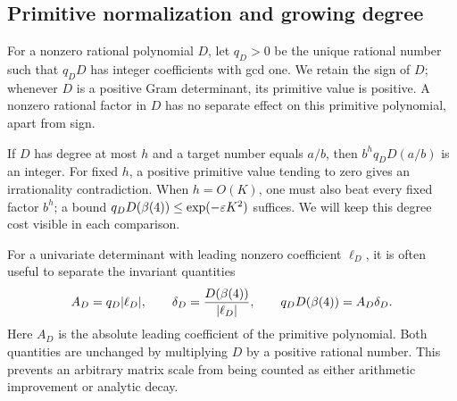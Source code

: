 \subsection{Primitive normalization and growing degree}
For a nonzero rational polynomial $D$, let $q_D>0$ be the unique rational
number such that $q_DD$ has integer coefficients with gcd one. We retain
the sign of $D$; whenever $D$ is a positive Gram determinant, its primitive
value is positive. A nonzero rational factor in $D$ has no separate
effect on this primitive polynomial, apart from sign.

If $D$ has degree at most $h$ and a target number equals $a/b$, then
$b^h q_DD(a/b)$ is an integer. For fixed $h$, a positive primitive value
tending to zero gives an irrationality contradiction. When $h=O(K)$,
one must also beat every fixed factor $b^h$; a bound
$q_DD(\beta(4))\leq\exp(-\varepsilon K^2)$ suffices. We will keep this
degree cost visible in each comparison.

For a univariate determinant with leading nonzero coefficient $\ell_D$,
it is often useful to separate the invariant quantities
\begin{equation}\label{eq:invariant}
 A_D=q_D|\ell_D|,\qquad
 \delta_D=\frac{D(\beta(4))}{|\ell_D|},\qquad
 q_DD(\beta(4))=A_D\delta_D.
\end{equation}
Here $A_D$ is the absolute leading coefficient of the primitive polynomial.
Both quantities are unchanged by multiplying $D$ by a positive rational
number. This prevents an arbitrary matrix scale from being counted as
either arithmetic improvement or analytic decay.
